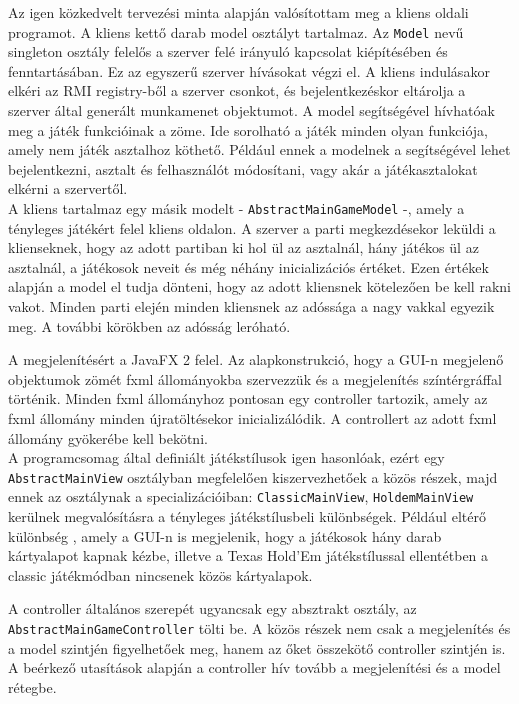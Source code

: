 Az igen közkedvelt tervezési minta alapján valósítottam meg a kliens oldali programot.
A kliens kettő darab model osztályt tartalmaz. Az \texttt{Model} nevű singleton osztály felelős a szerver felé irányuló kapcsolat kiépítésében és fenntartásában. Ez az egyszerű szerver hívásokat végzi el. A kliens indulásakor elkéri az RMI registry-ből a szerver csonkot, és bejelentkezéskor eltárolja a szerver által generált munkamenet objektumot. A model segítségével hívhatóak meg a játék funkcióinak a zöme. Ide sorolható a játék minden olyan funkciója, amely nem játék asztalhoz köthető. Például ennek a modelnek a segítségével lehet bejelentkezni, asztalt és felhasználót módosítani, vagy akár a játékasztalokat elkérni a szervertől. \\
A kliens tartalmaz egy másik modelt - \texttt{AbstractMainGameModel} -, amely a tényleges játékért felel kliens oldalon. A szerver a parti megkezdésekor leküldi a klienseknek, hogy az adott partiban ki hol ül az asztalnál, hány játékos ül az asztalnál, a játékosok neveit és még néhány inicializációs értéket. Ezen értékek alapján a model el tudja dönteni, hogy az adott kliensnek kötelezően be kell rakni vakot. Minden parti elején minden kliensnek az adóssága a nagy vakkal egyezik meg. A további körökben az adósság leróható.

A megjelenítésért a JavaFX 2 \cite{javafx} felel. Az alapkonstrukció, hogy a GUI-n megjelenő objektumok zömét fxml állományokba szervezzük és a megjelenítés színtérgráffal történik. Minden fxml állományhoz pontosan egy controller tartozik, amely az fxml állomány minden újratöltésekor inicializálódik. A controllert az adott fxml állomány gyökerébe kell bekötni. \\
A programcsomag által definiált játékstílusok igen hasonlóak, ezért egy \texttt{AbstractMainView} osztályban megfelelően kiszervezhetőek a közös részek, majd ennek az osztálynak a specializációiban: \texttt{ClassicMainView}, \texttt{HoldemMainView} kerülnek megvalósításra a tényleges játékstílusbeli különbségek. Például eltérő különbség , amely a GUI-n is megjelenik, hogy a játékosok hány darab kártyalapot kapnak kézbe, illetve a Texas Hold'Em játékstílussal ellentétben a classic játékmódban nincsenek közös kártyalapok.

A controller általános szerepét ugyancsak egy absztrakt osztály, az \texttt{AbstractMainGameController} tölti be. A közös részek nem csak a megjelenítés és a model szintjén figyelhetőek meg, hanem az őket összekötő controller szintjén is. A beérkező utasítások alapján a controller hív tovább a megjelenítési és a model rétegbe.

